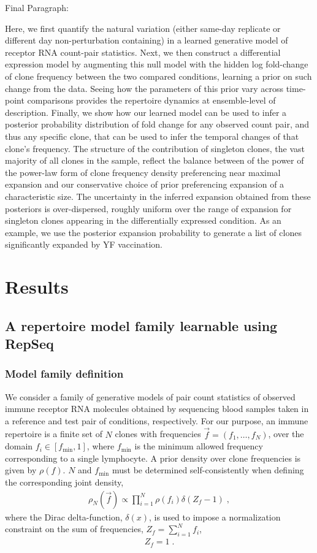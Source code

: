 \documentclass[letterpaper,english,prl,reprint,longbibliography]{revtex4-1} %
\begin{document}
Final Paragraph:

Here, we first quantify the natural variation (either same-day replicate or different day non-perturbation containing) in a learned generative model of receptor RNA count-pair statistics. Next, we then construct a differential expression model by augmenting this null model with the hidden log fold-change of clone frequency between the two compared conditions, learning a prior on such change from the data. Seeing how the parameters of this prior vary across time-point comparisons provides the repertoire dynamics at ensemble-level of description. Finally, we show how our learned model can be used to infer a posterior probability distribution of fold change for any observed count pair, and thus any specific clone, that can be used to infer the temporal changes of that clone's frequency. The structure of the contribution of singleton clones, the vast majority of all clones in the sample, reflect the balance between of the power of the power-law form of clone frequency density preferencing near maximal expansion and our conservative choice of prior preferencing expansion of a characteristic size. The uncertainty in the inferred expansion obtained from these posteriors is over-dispersed, roughly uniform over the range of expansion for singleton clones appearing in the differentially expressed condition.  As an example, we use the posterior expansion probability to generate a list of clones significantly expanded by YF vaccination. 

\section*{Results}

\subsection*{A repertoire model family learnable using RepSeq}

\subsubsection*{Model family definition}
We consider a family of generative models of pair count statistics of observed immune receptor RNA molecules obtained by sequencing blood samples taken in a reference and test pair of conditions, respectively. 
For our purpose, an immune repertoire is a finite set of $N$ clones with frequencies $\vec{f}=(f_1,\dots,f_N)$, over the domain $f_i\in[f_{\textrm{min}},1]$, where $f_{\textrm{min}}$ is the minimum allowed frequency corresponding to a single lymphocyte. A prior density over clone frequencies is given by $\rho(f)$. $N$ and $f_{\textrm{min}}$ must be determined self-consistently when defining the corresponding joint density, 
\begin{eqnarray}
	\rho_N(\vec{f})\propto \prod_{i=1}^N\rho(f_i)\delta(Z_f-1)\;,\label{eq:jointf}
\end{eqnarray}
where the Dirac delta-function, $\delta(x)$, is used to impose a normalization constraint on the sum of frequencies, $Z_f=\sum_{i=1}^N f_i$, 
\begin{align}
  Z_f=1\;. \label{eq:norm_constr}
\end{align}
\end{document}
